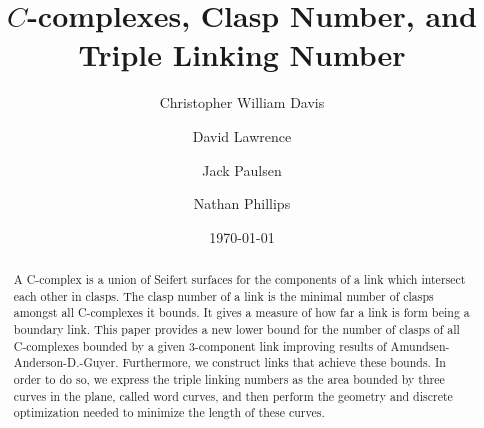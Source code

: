 \documentclass[11pt]{amsart}
\theoremstyle{remark}
\begin{document}
\title[Bounds on the clasp number.]{$C$-complexes, Clasp Number, and Triple Linking Number}




\author{Christopher William Davis}
\address{Department of Mathematics, University of Wisconsin-Eau Claire, Hibbard Humanities Hall 508,  Eau Claire WI 54702-4004}

\author{David Lawrence}
\address{Department of Mathematics, University of Wisconsin-Eau Claire, Hibbard Humanities Hall 508,  Eau Claire WI 54702-4004}

\author{Jack Paulsen}
\address{Department of Mathematics, University of Wisconsin-Eau Claire, Hibbard Humanities Hall 508,  Eau Claire WI 54702-4004}

\author{Nathan Phillips}
\address{Department of Mathematics, University of Wisconsin-Eau Claire, Hibbard Humanities Hall 508,  Eau Claire WI 54702-4004}



\date{\today}

\subjclass[2010]{}

\keywords{}

%    


\begin{abstract} A C-complex is a union of Seifert surfaces for the components of a link which intersect each other in clasps. The clasp number of a link is the minimal number of clasps amongst all C-complexes it bounds. It gives a measure of how far a link is form being a boundary link. This paper provides a new lower bound for the number of clasps of all C-complexes bounded by a given 3-component link improving results of Amundsen-Anderson-D.-Guyer. Furthermore, we construct links that achieve these bounds. 
In order to do so, we express the triple linking numbers as the area bounded by three curves in the plane, called word curves, and then perform the geometry and discrete optimization needed to minimize the length of these curves.
\end{abstract}
\end{document}
